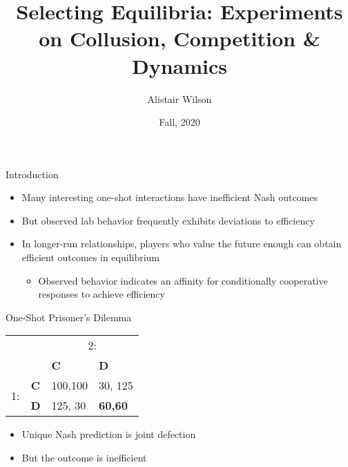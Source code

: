 \documentclass[english]{beamer}
\begin{document}
\title{Selecting Equilibria: Experiments on Collusion, Competition \& Dynamics}
\date{Fall, 2020}
\author{Alistair Wilson}

\maketitle

\begin{frame}{Introduction}
\begin{card}
	\begin{itemize}
		\item Many interesting one-shot interactions have inefficient Nash outcomes
		\item But observed lab behavior frequently exhibits deviations to efficiency
		\item In longer-run relationships, players who value the future enough can
		obtain efficient outcomes in equilibrium
			\begin{itemize}
				\item Observed behavior indicates an affinity for conditionally cooperative responses to achieve efficiency
			\end{itemize}
	\end{itemize}
	\end{card}
\end{frame}

\begin{frame}{One-Shot Prisoner's Dilemma}
	\begin{card}
	\begin{center}
		\begin{tabular}{cc|p{}|p{}|}
		 & \multicolumn{1}{c}{} & \multicolumn{2}{c}{2:}\\
		 & \multicolumn{1}{c}{} & \multicolumn{1}{p{0.14\textwidth}}{\textbf{C}} & \multicolumn{1}{p{0.14\textwidth}}{\textbf{D}}\\
		\cline{3-4}
		\multirow{2}{*}{1:} & \textbf{C} & 100,100 & 30, 125\\
		\cline{3-4}
		 & \textbf{D} & 125, 30 & \textbf{60,60}\\
		\cline{3-4}
		\end{tabular}
	\end{center}
    \end{card}
    \begin{card}
    \begin{itemize}
		\item Unique Nash prediction is joint defection
		\item But the outcome is inefficient
	\end{itemize}
	\end{card}
\end{frame}
\end{document}

